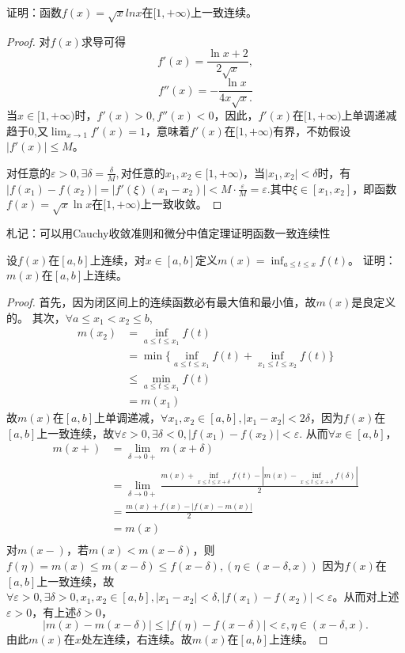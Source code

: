   \begin{example}
  证明：函数$f(x)=\sqrt{x}lnx$在$[1,+\infty)$上一致连续。%
  \end{example}

  \begin{proof}
  对$f(x)$求导可得
  \[f'(x)=\frac{\ln x+2}{2\sqrt x},\]
  \[f''(x)=-\frac{\ln x}{4x\sqrt x.}\]
  当$x\in[1,+\infty)$时，$f'(x)>0,f''(x)<0$，因此，$f'(x)$在$[1,+\infty)$上单调递减趋于0,又$\lim_{x\rightarrow1}f'(x)=1$，意味着$f'(x)$在$[1,+\infty)$有界，不妨假设$|f'(x)|\leq M$。
  
  对任意的$\varepsilon>0,\exists\delta=\frac{\delta}M,$对任意的$x_1,x_2\in[1,+\infty)$，当$|x_1,x_2|<\delta$时，有$|f(x_1)-f(x_2)|=|f'(\xi)(x_1-x_2)|<M\cdot\frac{\varepsilon}{M}=\varepsilon.$其中$\xi\in[x_1,x_2]$，即函数$f(x)=\sqrt{x}\ln x$在$[1,+\infty)$上一致收敛。
  \end{proof}

\begin{remark}
  札记：可以用Cauchy收敛准则和微分中值定理证明函数一致连续性
\end{remark}

\begin{example}
  设$f(x)$在$[a,b]$上连续，对$x\in[a,b]$定义$\displaystyle m(x)=\inf_{a\leq t\leq x}f(t)$。
  证明：$m(x)$在$[a,b]$上连续。%
  \end{example}

  \begin{proof}  
  首先，因为闭区间上的连续函数必有最大值和最小值，故$m(x)$是良定义的。
  其次，$\forall a\leq x_1<x_2\leq b$,
  \begin{align*}
  m(x_2)&=\inf_{a\leq t\leq x_1}f(t)\\
  &=\min\{\inf_{a\leq t\leq x_1}f(t)+\inf_{x_1\leq t\leq x_2}f(t)\}\\
  &\leq\min_{a\leq t\leq x_1}f(t)\\
  &=m(x_1)
  \end{align*}
  故$m(x)$在$[a,b]$上单调递减，$\forall x_1,x_2\in[a,b],|x_1-x_2|<2\delta$，因为$f(x)$在$[a,b]$上一致连续，故$\forall\varepsilon>0,\exists\delta<0,|f(x_1)-f(x_2)|<\varepsilon.$ 从而$\forall x\in[a,b]$，
  \begin{align*}
  m(x+)&=\lim_{\delta\rightarrow0+}m(x+\delta)\\
  &=\lim_{\delta\rightarrow0+}\frac{m(x)+\inf_{x\leq t\leq x+\delta}f(t)-|m(x)-\inf_{x\leq t\leq x+\delta}f(\delta)|}{2}\\
  &=\frac{m(x)+f(x)-|f(x)-m(x)|}{2}\\
  &=m(x)\\
  \end{align*}
  对$m(x-)$，若$m(x)<m(x-\delta)$，则$f(\eta)=m(x)\leq m(x-\delta)\leq f(x-\delta),(\eta\in(x-\delta,x))$
  因为$f(x)$在$[a,b]$上一致连续，故$\forall\varepsilon>0,\exists\delta>0,x_1,x_2\in[a,b],|x_1-x_2|<\delta,|f(x_1)-f(x_2)|<\varepsilon$。从而对上述$\varepsilon>0$，有上述$\delta>0$，$$|m(x)-m(x-\delta)|\leq|f(\eta)-f(x-\delta)|<\varepsilon, \eta\in(x-\delta,x).$$
  由此$m(x)$在$x$处左连续，右连续。故$m(x)$在$[a,b]$上连续。
  \end{proof}
  
